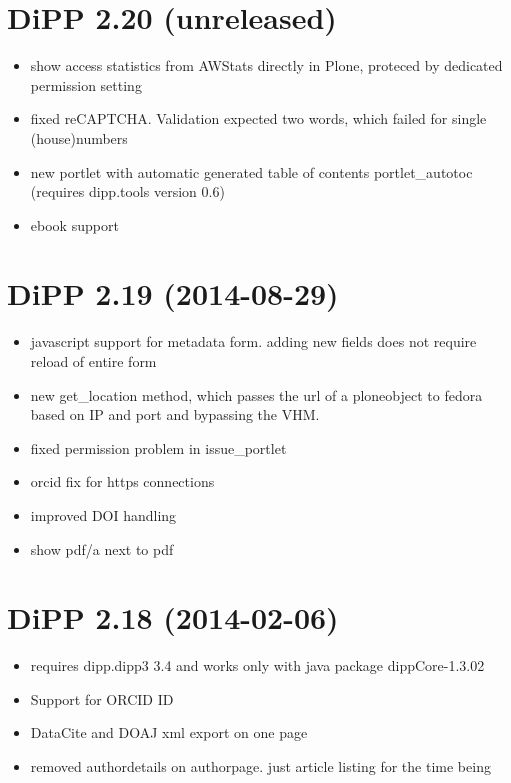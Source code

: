 \documentclass[a4paper,10pt,ngerman]{sphinxmanual}
\begin{document}
\section{DiPP 2.20 (unreleased)}
\label{changelog:dipp-2-20-unreleased}\begin{itemize}
\item {} 
show access statistics from AWStats directly in Plone, proteced by
dedicated permission setting

\item {} 
fixed reCAPTCHA. Validation expected two words, which failed for single
(house)numbers

\item {} 
new portlet with automatic generated table of contents portlet\_autotoc
(requires dipp.tools version 0.6)

\item {} 
ebook support

\end{itemize}


\section{DiPP 2.19 (2014-08-29)}
\label{changelog:dipp-2-19-2014-08-29}\begin{itemize}
\item {} 
javascript support for metadata form. adding new fields does not require
reload of entire form

\item {} 
new get\_location method, which passes the url of a ploneobject to fedora
based on IP and port and bypassing the VHM.

\item {} 
fixed permission problem in issue\_portlet

\item {} 
orcid fix for https connections

\item {} 
improved DOI handling

\item {} 
show pdf/a next to pdf

\end{itemize}


\section{DiPP 2.18 (2014-02-06)}
\label{changelog:dipp-2-18-2014-02-06}\begin{itemize}
\item {} 
requires dipp.dipp3 3.4 and works only with java package dippCore-1.3.02

\item {} 
Support for ORCID ID

\item {} 
DataCite and DOAJ xml export on one page

\item {} 
removed authordetails on authorpage. just article listing for the time being

\end{itemize}
\end{document}
